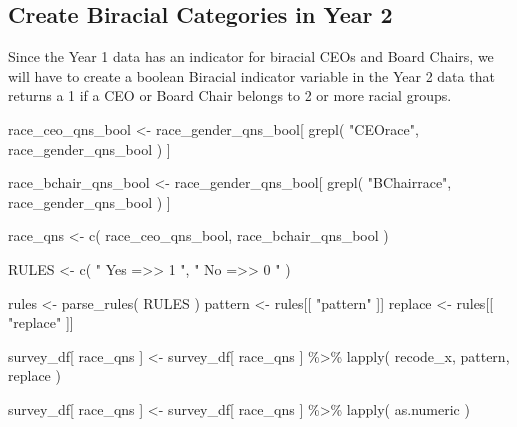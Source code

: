 \documentclass[
  letterpaper,
]{scrbook}
\newenvironment{Shaded}{\begin{snugshade}}{\end{snugshade}}
\newcommand{\FunctionTok}[1]{\textcolor[rgb]{0.28,0.35,0.67}{#1}}
\newcommand{\NormalTok}[1]{\textcolor[rgb]{0.00,0.23,0.31}{#1}}
\newcommand{\OtherTok}[1]{\textcolor[rgb]{0.00,0.23,0.31}{#1}}
\newcommand{\SpecialCharTok}[1]{\textcolor[rgb]{0.37,0.37,0.37}{#1}}
\newcommand{\StringTok}[1]{\textcolor[rgb]{0.13,0.47,0.30}{#1}}
\begin{document}
\subsection{Create Biracial Categories in Year
2}\label{create-biracial-categories-in-year-2}

Since the Year 1 data has an indicator for biracial CEOs and Board
Chairs, we will have to create a boolean Biracial indicator variable in
the Year 2 data that returns a 1 if a CEO or Board Chair belongs to 2 or
more racial groups.

\begin{Shaded}
\begin{Highlighting}[]
\NormalTok{race\_ceo\_qns\_bool }\OtherTok{\textless{}{-}} 
\NormalTok{  race\_gender\_qns\_bool[ }\FunctionTok{grepl}\NormalTok{( }\StringTok{"CEOrace"}\NormalTok{, race\_gender\_qns\_bool ) ]}

\NormalTok{race\_bchair\_qns\_bool }\OtherTok{\textless{}{-}} 
\NormalTok{  race\_gender\_qns\_bool[ }\FunctionTok{grepl}\NormalTok{( }\StringTok{"BChairrace"}\NormalTok{, race\_gender\_qns\_bool ) ]}

\NormalTok{race\_qns }\OtherTok{\textless{}{-}} \FunctionTok{c}\NormalTok{( race\_ceo\_qns\_bool, race\_bchair\_qns\_bool )}

\NormalTok{RULES }\OtherTok{\textless{}{-}} \FunctionTok{c}\NormalTok{(    }\StringTok{"    Yes  =\textgreater{}\textgreater{}   1    "}\NormalTok{, }
               \StringTok{"    No   =\textgreater{}\textgreater{}   0    "}\NormalTok{    )}

\NormalTok{rules }\OtherTok{\textless{}{-}} \FunctionTok{parse\_rules}\NormalTok{( RULES )          }
\NormalTok{pattern }\OtherTok{\textless{}{-}}\NormalTok{ rules[[ }\StringTok{"pattern"}\NormalTok{ ]]}
\NormalTok{replace }\OtherTok{\textless{}{-}}\NormalTok{ rules[[ }\StringTok{"replace"}\NormalTok{ ]]}

\NormalTok{survey\_df[ race\_qns ] }\OtherTok{\textless{}{-}} 
\NormalTok{  survey\_df[ race\_qns ] }\SpecialCharTok{\%\textgreater{}\%}
  \FunctionTok{lapply}\NormalTok{( recode\_x, pattern, replace )}

\NormalTok{survey\_df[ race\_qns ] }\OtherTok{\textless{}{-}} 
\NormalTok{  survey\_df[ race\_qns ] }\SpecialCharTok{\%\textgreater{}\%}
  \FunctionTok{lapply}\NormalTok{( as.numeric )}


\end{Highlighting}
\end{Shaded}
\end{document}
